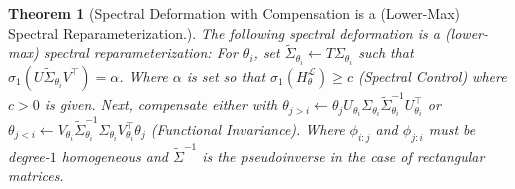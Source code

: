 \documentclass{article}
\theoremstyle{plain}
\newtheorem{theorem}{Theorem}
\theoremstyle{definition}
\theoremstyle{remark}
\begin{document}
\begin{theorem}[Spectral Deformation with Compensation is a (Lower-Max) Spectral Reparameterization.]
\label{thm:spectral-deformation-is-spec-reparam-app}
The following spectral deformation is a (lower-max) spectral reparameterization:
For $\theta_i$, set $\widetilde{\Sigma}_{\theta_i} \leftarrow T\Sigma_{\theta_i}$ such that $\sigma_1(U\widetilde{\Sigma}_{\theta_i}V^{\top}) = \alpha$. Where $\alpha$ is set so that $\sigma_1(H_{\theta}^{\mathcal{L}}) \geq c$ (Spectral Control) where $c > 0$ is given. Next, compensate either with $\theta_{j>i} \leftarrow \theta_j U_{\theta_i} \Sigma_{\theta_i} \widetilde{\Sigma}_{\theta_i}^{-1} U^{\top}_{\theta_i}$ or $\theta_{j<i} \leftarrow V_{\theta_i}\widetilde{\Sigma}^{-1}_{\theta_i} \Sigma_{\theta_i} V^{\top}_{\theta_i} \theta_j$ (Functional Invariance). Where $\phi_{i:j}$ and $\phi_{j:i}$ must be degree-$1$ homogeneous and $\widetilde{\Sigma}^{-1}$ is the pseudoinverse in the case of rectangular matrices.
\end{theorem}
\end{document}
